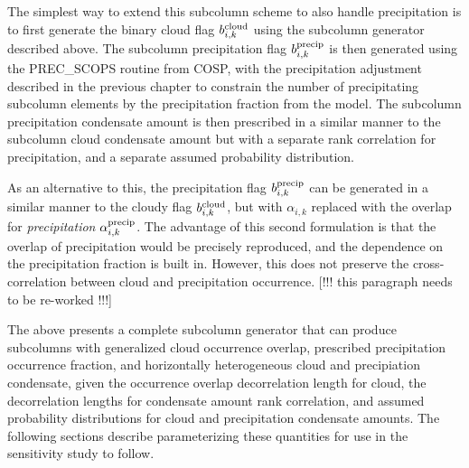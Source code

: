 The simplest way to extend this subcolumn scheme to also handle precipitation is to first generate the binary cloud flag $b^{\rm cloud}_{i, k}$ using the subcolumn generator described above. The subcolumn precipitation flag $b^{\rm precip}_{i, k}$ is then generated using the PREC\_SCOPS routine from COSP, with the precipitation adjustment described in the previous chapter to constrain the number of precipitating subcolumn elements by the precipitation fraction from the model. The subcolumn precipitation condensate amount is then prescribed in a similar manner to the subcolumn cloud condensate amount but with a separate rank correlation for precipitation, and a separate assumed probability distribution. 

As an alternative to this, the precipitation flag $b^{\rm precip}_{i, k}$ can be generated in a similar manner to the cloudy flag $b^{\rm cloud}_{i, k}$, but with $\alpha_{i, k}$ replaced with the overlap for \emph{precipitation} $\alpha^{\rm precip}_{i, k}$. The advantage of this second formulation is that the overlap of precipitation would be precisely reproduced, and the dependence on the precipitation fraction is built in. However, this does not preserve the cross-correlation between cloud and precipitation occurrence. [!!! this paragraph needs to be re-worked !!!]

The above presents a complete subcolumn generator that can produce subcolumns with generalized cloud occurrence overlap, prescribed precipitation occurrence fraction, and horizontally heterogeneous cloud and precipiation condensate, given the occurrence overlap decorrelation length for cloud, the decorrelation lengths for condensate amount rank correlation, and assumed probability distributions for cloud and precipitation condensate amounts. The following sections describe parameterizing these quantities for use in the sensitivity study to follow.

